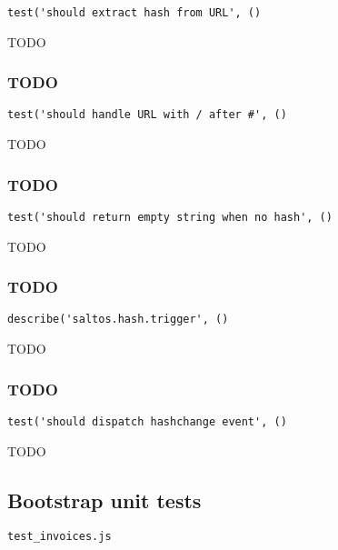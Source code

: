 \documentclass[a4paper]{article}
\begin{document}
\begin{lstlisting}
test('should extract hash from URL', ()
\end{lstlisting}

TODO

\hypertarget{toc655}{}
\subsubsection{TODO}

\begin{lstlisting}
test('should handle URL with / after #', ()
\end{lstlisting}

TODO

\hypertarget{toc656}{}
\subsubsection{TODO}

\begin{lstlisting}
test('should return empty string when no hash', ()
\end{lstlisting}

TODO

\hypertarget{toc657}{}
\subsubsection{TODO}

\begin{lstlisting}
describe('saltos.hash.trigger', ()
\end{lstlisting}

TODO

\hypertarget{toc658}{}
\subsubsection{TODO}

\begin{lstlisting}
test('should dispatch hashchange event', ()
\end{lstlisting}

TODO

\hypertarget{toc659}{}
\subsection{Bootstrap unit tests}

\begin{lstlisting}
test_invoices.js
\end{lstlisting}
\end{document}
